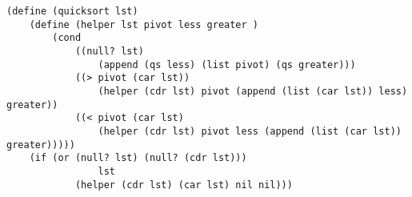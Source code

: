 \begin{solution}
\begin{lstlisting}
(define (quicksort lst)
    (define (helper lst pivot less greater )
        (cond
            ((null? lst) 
                (append (qs less) (list pivot) (qs greater)))
            ((> pivot (car lst)) 
                (helper (cdr lst) pivot (append (list (car lst)) less) greater))
            ((< pivot (car lst)
                (helper (cdr lst) pivot less (append (list (car lst)) greater)))))
    (if (or (null? lst) (null? (cdr lst))) 
		        lst 
            (helper (cdr lst) (car lst) nil nil)))

\end{lstlisting}


\end{solution}

